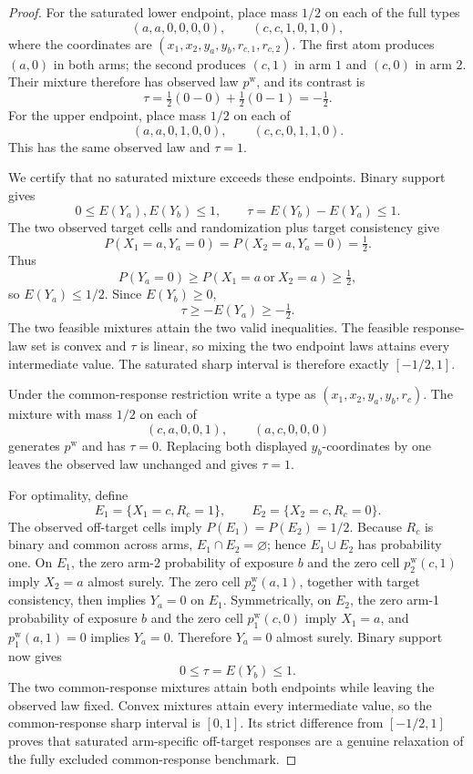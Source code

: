 \documentclass{article}
\begin{document}
\begin{proof}
For the saturated lower endpoint, place mass \(1/2\) on each of the full types
\[
(a,a,0,0,0,0),
\qquad
(c,c,1,0,1,0),
\]
where the coordinates are \((x_1,x_2,y_a,y_b,r_{c,1},r_{c,2})\).  The first atom produces \((a,0)\) in both arms; the second produces \((c,1)\) in arm \(1\) and \((c,0)\) in arm \(2\).  Their mixture therefore has observed law \(p^{\mathrm w}\), and its contrast is
\[
\tau=\tfrac12(0-0)+\tfrac12(0-1)=-\tfrac12.
\]
For the upper endpoint, place mass \(1/2\) on each of
\[
(a,a,0,1,0,0),
\qquad
(c,c,0,1,1,0).
\]
This has the same observed law and \(\tau=1\).

We certify that no saturated mixture exceeds these endpoints.  Binary support gives
\[
0\le E(Y_a),E(Y_b)\le1,
\qquad
\tau=E(Y_b)-E(Y_a)\le1.
\]
The two observed target cells and randomization plus target consistency give
\[
P(X_1=a,Y_a=0)=P(X_2=a,Y_a=0)=\tfrac12.
\]
Thus
\[
P(Y_a=0)
\ge P(X_1=a\ \text{or}\ X_2=a)
\ge\tfrac12,
\]
so \(E(Y_a)\le1/2\).  Since \(E(Y_b)\ge0\),
\[
\tau\ge-E(Y_a)\ge-\tfrac12.
\]
The two feasible mixtures attain the two valid inequalities.  The feasible response-law set is convex and \(\tau\) is linear, so mixing the two endpoint laws attains every intermediate value.  The saturated sharp interval is therefore exactly \([-1/2,1]\).

Under the common-response restriction write a type as \((x_1,x_2,y_a,y_b,r_c)\).  The mixture with mass \(1/2\) on each of
\[
(c,a,0,0,1),
\qquad
(a,c,0,0,0)
\]
generates \(p^{\mathrm w}\) and has \(\tau=0\).  Replacing both displayed \(y_b\)-coordinates by one leaves the observed law unchanged and gives \(\tau=1\).

For optimality, define
\[
E_1=\{X_1=c,R_c=1\},
\qquad
E_2=\{X_2=c,R_c=0\}.
\]
The observed off-target cells imply \(P(E_1)=P(E_2)=1/2\).  Because \(R_c\) is binary and common across arms, \(E_1\cap E_2=\varnothing\); hence \(E_1\cup E_2\) has probability one.  On \(E_1\), the zero arm-2 probability of exposure \(b\) and the zero cell \(p^{\mathrm w}_2(c,1)\) imply \(X_2=a\) almost surely.  The zero cell \(p^{\mathrm w}_2(a,1)\), together with target consistency, then implies \(Y_a=0\) on \(E_1\).  Symmetrically, on \(E_2\), the zero arm-1 probability of exposure \(b\) and the zero cell \(p^{\mathrm w}_1(c,0)\) imply \(X_1=a\), and \(p^{\mathrm w}_1(a,1)=0\) implies \(Y_a=0\).  Therefore \(Y_a=0\) almost surely.  Binary support now gives
\[
0\le\tau=E(Y_b)\le1.
\]
The two common-response mixtures attain both endpoints while leaving the observed law fixed.  Convex mixtures attain every intermediate value, so the common-response sharp interval is \([0,1]\).  Its strict difference from \([-1/2,1]\) proves that saturated arm-specific off-target responses are a genuine relaxation of the fully excluded common-response benchmark.
\end{proof}
\end{document}
